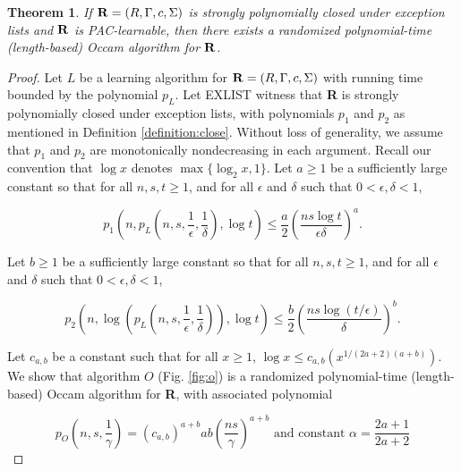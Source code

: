 \documentclass[12pt]{article}
\newtheorem{theorem}{Theorem}
\begin{document}
\begin{theorem} \label {theorem:ex}
If ${\bf R} = (R, \Gamma, c, \Sigma)$ is strongly polynomially closed under exception lists and ${\bf R}$ is PAC-learnable, then there exists a randomized polynomial-time (length-based) Occam algorithm for ${\bf R}$.
\end{theorem}

\begin{proof}
Let $L$ be a learning algorithm for ${\bf R} = (R, \Gamma, c, \Sigma)$ with running time bounded by the polynomial $p_L$. Let EXLIST witness that {\bf R} is strongly polynomially closed under exception lists, with polynomials $p_1$ and $p_2$ as mentioned in Definition \ref{definition:close}. Without loss of generality, we assume that $p_1$ and $p_2$ are monotonically nondecreasing in each argument. Recall our convention that $\log x$ denotes $\max \{ \log_2 x, 1\}$. Let $a \ge 1$ be a sufficiently large constant so that for all $n, s, t \ge 1$, and for all $\epsilon$ and $\delta$ such that $0 < \epsilon, \delta < 1$,

\begin{equation*}
p_1(n, p_L(n, s, \frac {1}{\epsilon}, \frac {1}{\delta}), \log t) \le \frac {a}{2} (\frac{ns \log t}{\epsilon \delta})^a.
\end{equation*}

Let $b \ge 1$ be a sufficiently large constant so that for all $n, s, t \ge 1$, and for all $\epsilon$ and $\delta$ such that $0 < \epsilon, \delta < 1$,

\begin{equation*}
p_2(n, \log (p_L(n, s, \frac {1}{\epsilon}, \frac {1}{\delta})), \log t) \le \frac {b}{2} (\frac{ns \log (t / \epsilon)}{\delta})^b.
\end{equation*}

Let $c_{a,b}$ be a constant such that for all $x \ge 1$, $\log x \le c_{a,b} (x^{1/(2a + 2)(a + b)})$. \\

We show that algorithm $O$ (Fig. \ref{fig:o}) is a randomized polynomial-time (length-based) Occam algorithm for {\bf R}, with associated polynomial

\begin{equation*}
p_O(n, s, \frac {1}{\gamma}) = (c_{a,b})^{a+b}ab(\frac{ns}{\gamma})^{a+b} \text {    and constant    } \alpha = \frac {2a + 1}{2a + 2}
\end{equation*}


\end{proof}
\end{document}
